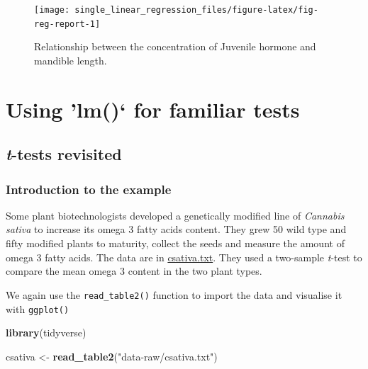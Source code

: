 \documentclass[
]{book}
\newenvironment{Shaded}{\begin{snugshade}}{\end{snugshade}}
\newcommand{\KeywordTok}[1]{\textcolor[rgb]{0.13,0.29,0.53}{\textbf{#1}}}
\newcommand{\NormalTok}[1]{#1}
\newcommand{\StringTok}[1]{\textcolor[rgb]{0.31,0.60,0.02}{#1}}
\begin{document}
\begin{figure}

\texttt{[image: single\_linear\_regression\_files/figure-latex/fig-reg-report-1]} \hfill{}

\caption{Relationship between the concentration of Juvenile hormone and mandible length.}\label{fig:fig-reg-report}
\end{figure}

\hypertarget{part-using-lm-for-familiar-tests}{%
\part{Using 'lm()` for familiar tests}\label{part-using-lm-for-familiar-tests}}

\hypertarget{t-tests-revisit}{%
\chapter{\texorpdfstring{\emph{t}-tests revisited}{t-tests revisited}}\label{t-tests-revisit}}

\hypertarget{introduction-to-the-example-1}{%
\section{Introduction to the example}\label{introduction-to-the-example-1}}

Some plant biotechnologists developed a genetically modified line of \emph{Cannabis sativa} to increase its omega 3 fatty acids content. They grew 50 wild type and fifty modified plants to maturity, collect the seeds and measure the amount of omega 3 fatty acids. The data are in \href{data-raw/csativa.txt}{csativa.txt}. They used a two-sample \emph{t}-test to compare the mean omega 3 content in the two plant types.

We again use the \texttt{read\_table2()} function to import the data and visualise it with \texttt{ggplot()}

\begin{Shaded}
\begin{Highlighting}[]
\KeywordTok{library}\NormalTok{(tidyverse)}
\end{Highlighting}
\end{Shaded}

\begin{Shaded}
\begin{Highlighting}[]
\NormalTok{csativa  <-}\StringTok{  }\KeywordTok{read_table2}\NormalTok{(}\StringTok{"data-raw/csativa.txt"}\NormalTok{)}
\end{Highlighting}
\end{Shaded}
\end{document}
